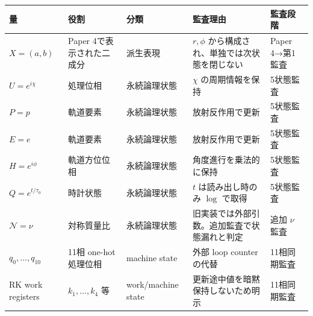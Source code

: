 \documentclass[
  a4paper,
]{ltjsarticle}
\newcounter{none} %
\begin{document}
{\def\LTcaptype{none} %
\begin{longtable}[]{@{}
  >{\raggedright\arraybackslash}p{}
  >{\raggedright\arraybackslash}p{}
  >{\raggedright\arraybackslash}p{}
  >{\raggedright\arraybackslash}p{}
  >{\raggedright\arraybackslash}p{}@{}}
\toprule\noalign{}
\begin{minipage}[b]{\linewidth}\raggedright
量
\end{minipage} & \begin{minipage}[b]{\linewidth}\raggedright
役割
\end{minipage} & \begin{minipage}[b]{\linewidth}\raggedright
分類
\end{minipage} & \begin{minipage}[b]{\linewidth}\raggedright
監査理由
\end{minipage} & \begin{minipage}[b]{\linewidth}\raggedright
監査段階
\end{minipage} \\
\midrule\noalign{}
\endhead
\bottomrule\noalign{}
\endlastfoot
\(X=(a,b)\) & Paper 4で表示された二成分 & 派生表現 & \(r,\phi\)
から構成され、単独では次状態を閉じない & Paper 4→第1監査 \\
\(U=e^{i\chi}\) & 処理位相 & 永続論理状態 & \(\chi\) の周期情報を保持 &
5状態監査 \\
\(P=p\) & 軌道要素 & 永続論理状態 & 放射反作用で更新 & 5状態監査 \\
\(E=e\) & 軌道要素 & 永続論理状態 & 放射反作用で更新 & 5状態監査 \\
\(H=e^{i\phi}\) & 軌道方位位相 & 永続論理状態 & 角度進行を乗法的に保持 &
5状態監査 \\
\(Q=e^{t/\tau_0}\) & 時計状態 & 永続論理状態 & \(t\) は読み出し時のみ
\(\log\) で取得 & 5状態監査 \\
\(\mathcal N=\nu\) & 対称質量比 & 永続論理状態 &
旧実装では外部引数。追加監査で状態漏れと判定 & 追加 \(\nu\) 監査 \\
\(q_0,\ldots,q_{10}\) & 11相 one-hot 処理位相 & machine state & 外部
loop counter の代替 & 11相同期監査 \\
RK work registers & \(k_1,\ldots,k_4\) 等 & work/machine state &
更新途中値を暗黙保持しないため明示 & 11相同期監査 \\
\end{longtable}
}
\end{document}
